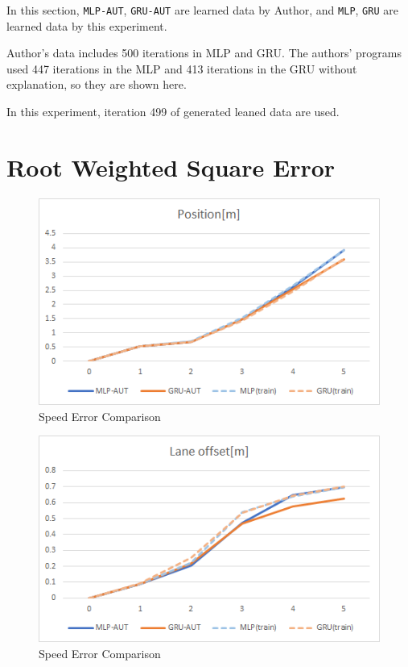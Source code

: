 In this section, {\tt MLP-AUT}, {\tt GRU-AUT} are learned data by Author, and {\tt MLP}, {\tt GRU} are learned data by this experiment.


Author's data includes 500 iterations in MLP and GRU. The authors' programs used 447 iterations in the MLP and 413 iterations in the GRU without explanation, so they are shown here.

In this experiment, iteration 499 of generated leaned data are used.




\section{Root Weighted Square Error}


\begin{figure}[H]
\begin{center}
\includegraphics[width=14cm]{./figures/graph_position.png}
\caption{Speed Error Comparison}
\label{fig:graph_position}
\end{center}
\end{figure}

\begin{figure}[H]
\begin{center}
\includegraphics[width=14cm]{./figures/graph_lane.png}
\caption{Speed Error Comparison}
\label{fig:graph_lane}
\end{center}
\end{figure}

